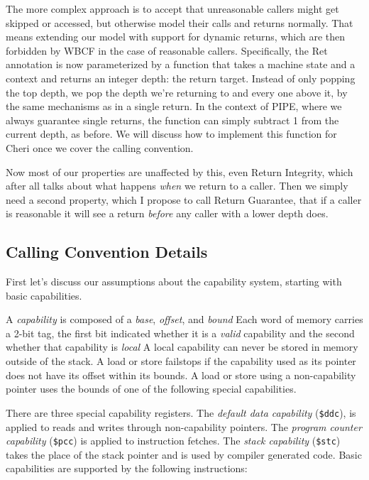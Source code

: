 \documentclass{article}
\begin{document}
The more complex approach is to accept that unreasonable callers might get skipped or
accessed, but otherwise model their calls and returns normally. That means extending
our model with support for dynamic returns, which are then forbidden by WBCF in the case
of reasonable callers. Specifically, the {\sc Ret} annotation is now parameterized by
a function that takes a machine state and a context and returns an integer depth: the
return target. Instead of only popping the top depth, we pop the depth
we're returning to and every one above it, by the same mechanisms as in a single return.
In the context of PIPE, where we always guarantee single returns, the function can simply
subtract 1 from the current depth, as before. We will discuss how to implement this
function for Cheri once we cover the calling convention.

Now most of our properties are unaffected by this, even Return Integrity, which after
all talks about what happens {\it when} we return to a caller. Then we simply need a second
property, which I propose to call Return Guarantee, that if a caller is reasonable it
will see a return {\it before} any caller with a lower depth does.

\subsection{Calling Convention Details}

First let's discuss our assumptions about the capability system, starting with basic
capabilities.

A {\em capability} is composed of a {\em base}, {\em offset}, and {\em bound}
Each word of memory carries a 2-bit tag, the first bit indicated whether it is a
{\em valid} capability and the second whether that capability is {\em local}
A local capability can never be stored in memory outside of the stack. A load or store
failstops if the capability used as its pointer does not have its offset within its
bounds. A load or store using a non-capability pointer uses the bounds of one of the
following special capabilities.

There are three special capability registers. The {\em default data capability} ({\tt \$ddc}),
is applied to reads and writes through non-capability pointers. The
{\em program counter capability} ({\tt \$pcc}) is applied to instruction fetches.
The {\em stack capability} ({\tt \$stc}) takes the place of the stack pointer and is used by
compiler generated code. Basic capabilities are supported by the following instructions:
\end{document}
